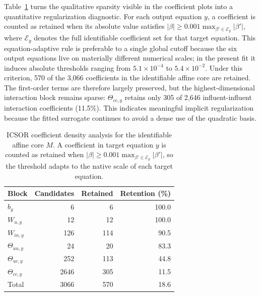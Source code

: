 \documentclass[11pt]{article}
\begin{document}
Table~\ref{tab:icsor_density} turns the qualitative sparsity visible in the coefficient plots into a quantitative regularization diagnostic. For each output equation $y$, a coefficient is counted as retained when its absolute value satisfies $|\beta| \ge 0.001 \max_{\beta' \in \mathcal{E}_y} |\beta'|$, where $\mathcal{E}_y$ denotes the full identifiable coefficient set for that target equation. This equation-adaptive rule is preferable to a single global cutoff because the six output equations live on materially different numerical scales; in the present fit it induces absolute thresholds ranging from $5.1 \times 10^{-4}$ to $5.4 \times 10^{-2}$. Under this criterion, 570 of the 3{,}066 coefficients in the identifiable affine core are retained. The first-order terms are therefore largely preserved, but the highest-dimensional interaction block remains sparse: $\Theta_{cc,y}$ retains only 305 of 2{,}646 influent-influent interaction coefficients (11.5\%). This indicates meaningful implicit regularization because the fitted surrogate continues to avoid a dense use of the quadratic basis.

\begin{table}[htbp]
\centering
\caption{ICSOR coefficient density analysis for the identifiable affine core $M$. A coefficient in target equation $y$ is counted as retained when $|\beta| \ge 0.001 \max_{\beta' \in \mathcal{E}_y} |\beta'|$, so the threshold adapts to the native scale of each target equation.}
\label{tab:icsor_density}
\small
\begin{tabular}{@{}lrrr@{}}
\toprule
\textbf{Block} & \textbf{Candidates} & \textbf{Retained} & \textbf{Retention (\%)} \\
\midrule
$b_y$ & 6 & 6 & 100.0 \\
$W_{u,y}$ & 12 & 12 & 100.0 \\
$W_{in,y}$ & 126 & 114 & 90.5 \\
$\Theta_{uu,y}$ & 24 & 20 & 83.3 \\
$\Theta_{uc,y}$ & 252 & 113 & 44.8 \\
$\Theta_{cc,y}$ & 2646 & 305 & 11.5 \\
\midrule
Total & 3066 & 570 & 18.6 \\
\bottomrule
\end{tabular}
\end{table}
\end{document}
